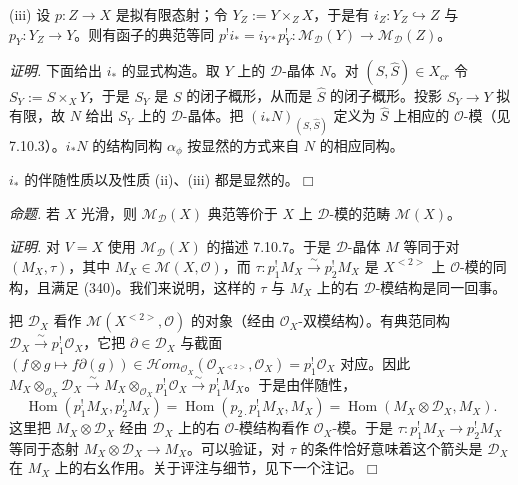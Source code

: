 (iii) 设 $p:Z\to X$ 是拟有限态射；令 $Y_{Z}:=Y\times_{Z}X$，于是有 $i_{Z}:Y_{Z}\hookrightarrow Z$ 与 $p_{Y}:Y_{Z}\to Y$。则有函子的典范等同 $p^{!}i_{*}=i_{Y*}p^{!}_{Y}:\mathcal{M}_{\mathcal{D}}(Y)\to\mathcal{M}_{\mathcal{D}}(Z)$。

\emph{证明.} 下面给出 $i_{*}$ 的显式构造。取 $Y$ 上的 $\mathcal{D}$-晶体 $N$。对 $(S,\hat S)\in X_{cr}$ 令 $S_{Y}:=S\times_{X}Y$，于是 $S_{Y}$ 是 $S$ 的闭子概形，从而是 $\hat S$ 的闭子概形。投影 $S_{Y}\to Y$ 拟有限，故 $N$ 给出 $S_{Y}$ 上的 $\mathcal{D}$-晶体。把 $(i_{*}N)_{(S,\hat S)}$ 定义为 $\hat S$ 上相应的 $\mathcal{O}$-模（见 7.10.3）。$i_{*}N$ 的结构同构 $\alpha_{\phi}$ 按显然的方式来自 $N$ 的相应同构。

$i_{*}$ 的伴随性质以及性质 (ii)、(iii) 都是显然的。\hfill$\Box$

 \emph{命题.} 若 $X$ 光滑，则 $\mathcal{M}_{\mathcal{D}}(X)$ 典范等价于 $X$ 上 $\mathcal{D}$-模的范畴 $\mathcal{M}(X)$。

\emph{证明.} 对 $V=X$ 使用 $\mathcal{M}_{\mathcal{D}}(X)$ 的描述 7.10.7。于是 $\mathcal{D}$-晶体 $M$ 等同于对 $(M_{X},\tau)$，其中 $M_{X}\in\mathcal{M}(X,\mathcal{O})$，而 $\tau:p^{!}_{1}M_{X}\xrightarrow{\sim}p^{!}_{2}M_{X}$ 是 $X^{<2>}$ 上 $\mathcal{O}$-模的同构，且满足 (340)。我们来说明，这样的 $\tau$ 与 $M_{X}$ 上的右 $\mathcal{D}$-模结构是同一回事。

把 $\mathcal{D}_{X}$ 看作 $\mathcal{M}(X^{<2>},\mathcal{O})$ 的对象（经由 $\mathcal{O}_{X}$-双模结构）。有典范同构 $\mathcal{D}_{X}\xrightarrow{\sim}p^{!}_{1}\mathcal{O}_{X}$，它把 $\partial\in\mathcal{D}_{X}$ 与截面 $(f\otimes g\mapsto f\partial(g))\in\mathcal{H}om_{\mathcal{O}_{X}}(\mathcal{O}_{X^{<2>}},\mathcal{O}_{X})=p^{!}_{1}\mathcal{O}_{X}$ 对应。因此 $M_{X}\otimes_{\mathcal{O}_{X}}\mathcal{D}_{X}\xrightarrow{\sim}M_{X}\otimes_{\mathcal{O}_{X}}p^{!}_{1}\mathcal{O}_{X}\xrightarrow{\sim}p^{!}_{1}M_{X}$。于是由伴随性，
\begin{equation}\tag{341}
\operatorname{Hom}(p^{!}_{1}M_{X},p^{!}_{2}M_{X})=\operatorname{Hom}(p_{2\cdot}p^{!}_{1}M_{X},M_{X})=\operatorname{Hom}(M_{X}\otimes\mathcal{D}_{X},M_{X}).
\end{equation}
这里把 $M_{X}\otimes\mathcal{D}_{X}$ 经由 $\mathcal{D}_{X}$ 上的右 $\mathcal{O}$-模结构看作 $\mathcal{O}_{X}$-模。于是 $\tau:p^{!}_{1}M_{X}\to p^{!}_{2}M_{X}$ 等同于态射 $M_{X}\otimes\mathcal{D}_{X}\to M_{X}$。可以验证，对 $\tau$ 的条件恰好意味着这个箭头是 $\mathcal{D}_{X}$ 在 $M_{X}$ 上的右幺作用。关于评注与细节，见下一个注记。\hfill$\Box$

